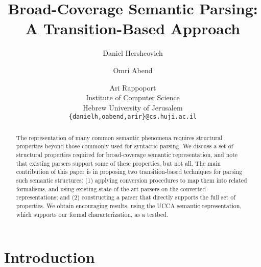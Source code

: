\documentclass[11pt]{article}
\title{Broad-Coverage Semantic Parsing: A Transition-Based Approach}
\author{Daniel Hershcovich \and Omri Abend \and Ari Rappoport \\
  Institute of Computer Science \\
  Hebrew University of Jerusalem \\
  {\tt \{danielh,oabend,arir\}@cs.huji.ac.il}
}
\date{}
\begin{document}
\maketitle

\begin{abstract}

  The representation of many common semantic phenomena requires 
  structural properties beyond those commonly used for syntactic parsing.
  We discuss a set of structural properties required for
  broad-coverage semantic representation, and note that existing
  parsers support some of these properties, but not all.
  The main contribution of this paper is in proposing
  two transition-based techniques for parsing such semantic structures:
  (1) applying conversion procedures to map them into related formalisms,
  and using existing state-of-the-art parsers on the converted representations;
  and (2) constructing a parser that directly supports the full set of properties.
  We obtain encouraging results, using the UCCA semantic representation, which
  supports our formal characterization, as a testbed.
  
  
\end{abstract}



\section{Introduction}
\end{document}
